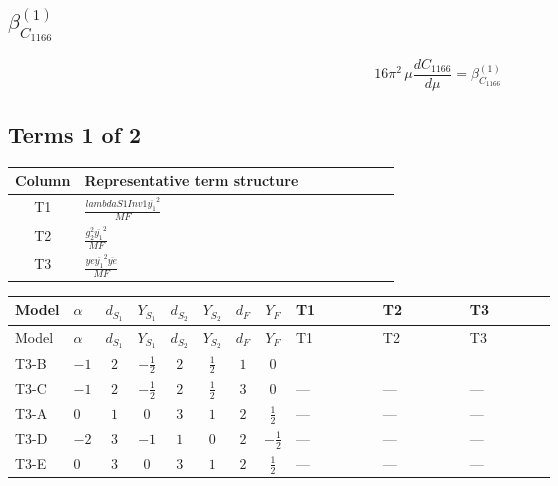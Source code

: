 \documentclass[8pt]{article}
\begin{document}
\begin{landscape}
\section*{$\beta_{C_{1166}}^{(1)}$}
\[16\pi^2\,\mu\frac{d C_{1166}}{d\mu}=\beta_{C_{1166}}^{(1)}\]
\subsection*{Terms 1 of 2}
\begin{center}
\begin{tabular}{@{}c >{\raggedright\arraybackslash}p{0.82\linewidth}@{}}
\toprule
Column & Representative term structure \\
\midrule
T1 & \(\displaystyle \frac{lambdaS1Inv1 \overline{y_{1}}^{2}}{MF}\) \\
\midrule
T2 & \(\displaystyle \frac{g_{2}^{2} \overline{y_{1}}^{2}}{MF}\) \\
\midrule
T3 & \(\displaystyle \frac{ye \overline{y_{1}}^{2} \overline{ye}}{MF}\) \\
\midrule
\bottomrule
\end{tabular}
\end{center}
\smallskip
\tiny
\begin{longtable}{@{}llcccccc >{\raggedright\arraybackslash}p{0.21\linewidth} >{\raggedright\arraybackslash}p{0.21\linewidth} >{\raggedright\arraybackslash}p{0.21\linewidth}@{}}
\toprule
Model & $\alpha$ & $d_{S_1}$ & $Y_{S_1}$ & $d_{S_2}$ & $Y_{S_2}$ & $d_F$ & $Y_F$ & T1 & T2 & T3 \\
\midrule
\endfirsthead
\toprule
Model & $\alpha$ & $d_{S_1}$ & $Y_{S_1}$ & $d_{S_2}$ & $Y_{S_2}$ & $d_F$ & $Y_F$ & T1 & T2 & T3 \\
\midrule
\endhead
T3-B & $-1$ & $2$ & $-\frac{1}{2}$ & $2$ & $\frac{1}{2}$ & $1$ & $0$ & \scriptsize\adjustbox{max width=\linewidth}{$\begin{gathered} \frac{lambdaS1Inv1 \overline{y_{1}}^{2}}{2 MF}\end{gathered}$} & \scriptsize\adjustbox{max width=\linewidth}{$\begin{gathered} \frac{3 g_{2}^{2} \overline{y_{1}}^{2}}{4 MF}\end{gathered}$} & \scriptsize\adjustbox{max width=\linewidth}{$\begin{gathered} - \frac{ye \overline{y_{1}}^{2} \overline{ye}}{4 MF}\end{gathered}$} \\
\midrule
T3-C & $-1$ & $2$ & $-\frac{1}{2}$ & $2$ & $\frac{1}{2}$ & $3$ & $0$ & --- & --- & --- \\
\midrule
T3-A & $0$ & $1$ & $0$ & $3$ & $1$ & $2$ & $\frac{1}{2}$ & --- & --- & --- \\
\midrule
T3-D & $-2$ & $3$ & $-1$ & $1$ & $0$ & $2$ & $-\frac{1}{2}$ & --- & --- & --- \\
\midrule
T3-E & $0$ & $3$ & $0$ & $3$ & $1$ & $2$ & $\frac{1}{2}$ & --- & --- & --- \\
\midrule
\bottomrule
\end{longtable}
\clearpage

\end{landscape}
\end{document}
